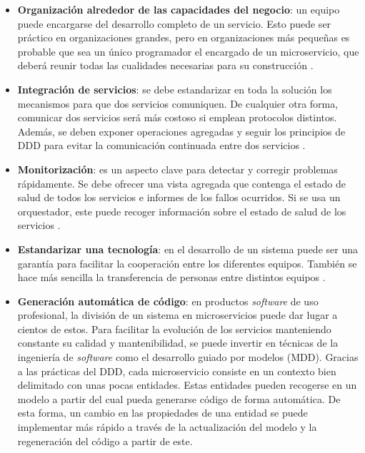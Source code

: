 \documentclass[11pt,spanish,listoffigures]{tfgetsinf}
\begin{document}
\begin{itemize}

\item \textbf{Organización alrededor de las capacidades del negocio}: un equipo puede encargarse del desarrollo completo de un servicio. Esto puede ser práctico en organizaciones grandes, pero en organizaciones más pequeñas es probable que sea un único programador el encargado de un microservicio, que deberá reunir todas las cualidades necesarias para su construcción \cite{Newman2015a, Lewis2014, DelaTorre2018, Hunter2017}.

\item \textbf{Integración de servicios}: se debe estandarizar en toda la solución los mecanismos para que dos servicios comuniquen. De cualquier otra forma, comunicar dos servicios será más costoso si emplean protocolos distintos. Además, se deben exponer operaciones agregadas y seguir los principios de DDD para evitar la comunicación continuada entre dos servicios \cite{Newman2015a, DelaTorre2018}.

\item \textbf{Monitorización}: es un aspecto clave para detectar y corregir problemas rápidamente. Se debe ofrecer una vista agregada que contenga el estado de salud  de todos los servicios e informes de los fallos ocurridos. Si se usa un orquestador, este puede recoger información sobre el estado de salud de los servicios \cite{Newman2015a, DelaTorre2018}.

\item \textbf{Estandarizar una tecnología}: en el desarrollo de un sistema puede ser una garantía para facilitar la cooperación entre los diferentes equipos. También se hace más sencilla la transferencia de personas entre distintos equipos \cite{Newman2015a}.

\item \textbf{Generación automática de código}: en productos \textit{software} de uso profesional, la división de un sistema en microservicios puede dar lugar a cientos de estos. Para facilitar la evolución de los servicios manteniendo constante su calidad y mantenibilidad, se puede invertir en técnicas de la ingeniería de \textit{software} como el desarrollo guiado por modelos (MDD). Gracias a las prácticas del DDD, cada microservicio consiste en un contexto bien delimitado con unas pocas entidades. Estas entidades pueden recogerse en un modelo a partir del cual pueda generarse código de forma automática. De esta forma, un cambio en las propiedades de una entidad se puede implementar más rápido a través de la actualización del modelo y la regeneración del código a partir de este.

\end{itemize}
\end{document}

